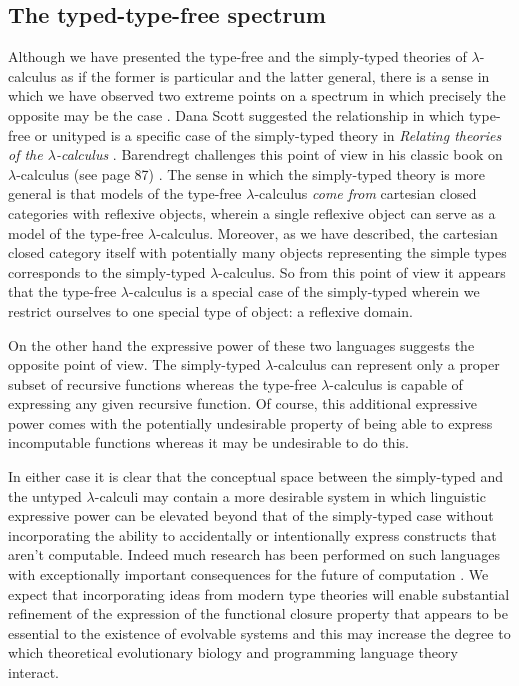 \documentclass[10pt]{article}
\theoremstyle{plain}
\theoremstyle{definition}
\theoremstyle{remark}
\begin{document}
\subsection{The typed-type-free spectrum}
Although we have presented the type-free and the simply-typed theories of $\lambda$-calculus as if the former is particular and the latter general, there is a sense in which we have observed two extreme points on a spectrum in which precisely the opposite may be the case \cite{Scott1980,Barendregt1985}. Dana Scott suggested the relationship in which type-free or unityped is a specific case of the simply-typed theory in \emph{Relating theories of the $\lambda$-calculus} \cite{Scott1980}. Barendregt challenges this point of view in his classic book on $\lambda$-calculus (see page 87) \cite{Barendregt1985}. The sense in which the simply-typed theory is more general is that models of the type-free $\lambda$-calculus \emph{come from} cartesian closed categories with reflexive objects, wherein a single reflexive object can serve as a model of the type-free $\lambda$-calculus. Moreover, as we have described, the cartesian closed category itself with potentially many objects representing the simple types corresponds to the simply-typed $\lambda$-calculus. So from this point of view it appears that the type-free $\lambda$-calculus is a special case of the simply-typed wherein we restrict ourselves to one special type of object: a reflexive domain.

On the other hand the expressive power of these two languages suggests the opposite point of view. The simply-typed $\lambda$-calculus can represent only a proper subset of recursive functions whereas the type-free $\lambda$-calculus is capable of expressing any given recursive function. Of course, this additional expressive power comes with the potentially undesirable property of being able to express incomputable functions whereas it may be undesirable to do this.

In either case it is clear that the conceptual space between the simply-typed and the untyped $\lambda$-calculi may contain a more desirable system in which linguistic expressive power can be elevated beyond that of the simply-typed case without incorporating the ability to accidentally or intentionally express constructs that aren't computable. Indeed much research has been performed on such languages with exceptionally important consequences for the future of computation \cite{Coquand1988,Frade2009}. We expect that incorporating ideas from modern type theories will enable substantial refinement of the expression of the functional closure property that appears to be essential to the existence of evolvable systems and this may increase the degree to which theoretical evolutionary biology and programming language theory interact.
\end{document}
